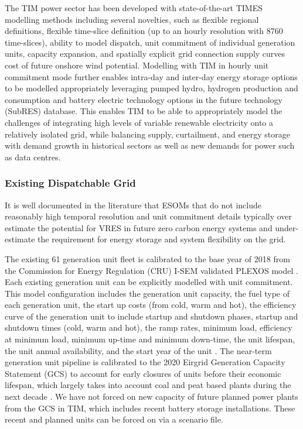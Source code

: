 \documentclass[journal abbreviation, manuscript]{copernicus}
\begin{document}
The TIM power sector has been developed with state-of-the-art TIMES modelling methods including several novelties, such as flexible regional definitions, flexible time-slice definition (up to an hourly resolution with 8760 time-slices), ability to model dispatch, unit commitment of individual generation units, capacity expansion, and spatially explicit grid connection supply curves cost of future onshore wind potential. Modelling with TIM in hourly unit commitment mode further enables intra-day and inter-day energy storage options to be modelled appropriately leveraging pumped hydro, hydrogen production and consumption and battery electric technology options in the future technology (SubRES) database. This enables TIM to be able to appropriately model the challenges of integrating high levels of variable renewable electricity onto a relatively isolated grid, while balancing supply, curtailment, and energy storage with demand growth in historical sectors as well as new demands for power such as data centres.

\subsubsection{Existing Dispatchable Grid}
It is well documented in the literature that ESOMs that do not include reasonably high temporal resolution and unit commitment details typically over estimate the potential for VRES in future zero carbon energy systems and under-estimate the requirement for energy storage and system flexibility on the grid.

The existing 61 generation unit fleet is calibrated to the base year of 2018 from the Commission for Energy Regulation (CRU) I-SEM validated PLEXOS model \cite{Geffert2018}. Each existing generation unit can be explicitly modelled with unit commitment. This model configuration includes the generation unit capacity, the fuel type of each generation unit, the start up costs (from cold, warm and hot), the efficiency curve of the generation unit to include startup and shutdown phases, startup and shutdown times (cold, warm and hot), the ramp rates, minimum load, efficiency at minimum load, minimum up-time and minimum down-time, the unit lifespan, the unit annual availability, and the start year of the unit \cite{Geffert2018}. The near-term generation unit pipeline is calibrated to the 2020 Eirgrid Generation Capacity Statement (GCS) to account for early closures of units before their economic lifespan, which largely takes into account coal and peat based plants during the next decade \cite{EirGridadSONI2019}. We have not forced on new capacity of future planned power plants from the GCS in TIM, which includes recent battery storage installations. These recent and planned units can be forced on via a scenario file. 
\end{document}
